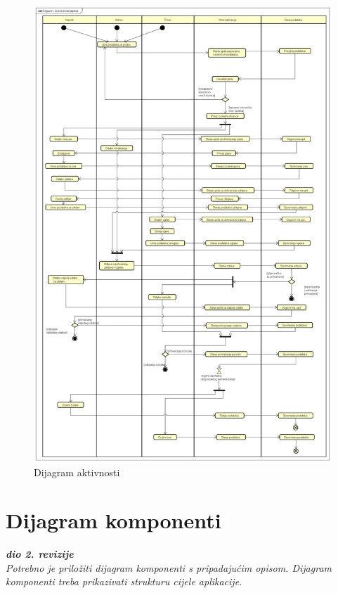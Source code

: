 			\begin{figure}[H]
				\centering
				\includegraphics[width=15cm]{slike/dijagram_aktivnosti}
				\caption{Dijagram aktivnosti}
				\label{fig:Activity-Diagram}
			\end{figure}
			
			 
			
			\eject
		\section{Dijagram komponenti}
		
			\textbf{\textit{dio 2. revizije}}\\
		
			 \textit{Potrebno je priložiti dijagram komponenti s pripadajućim opisom. Dijagram komponenti treba prikazivati strukturu cijele aplikacije.}